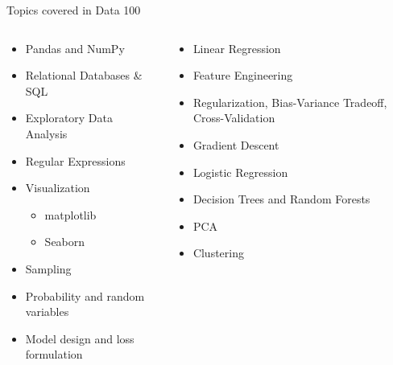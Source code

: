 \documentclass[aspectratio=169]{../latex_main/tntbeamer}  %
\begin{document}
	\begin{frame}{Topics covered in Data 100}
	    \begin{columns}
	        \begin{column}{.4\textwidth}
	            \begin{itemize}
	                \item Pandas and NumPy
	                \item Relational Databases \& SQL
	                \item Exploratory Data Analysis
	                \item Regular Expressions
	                \item Visualization
	                \begin{itemize}
	                    \item matplotlib
	                    \item Seaborn
	                \end{itemize}
	                \item Sampling
	                \item Probability and random variables
	                \item Model design and loss formulation
	            \end{itemize}
	        \end{column}
	        \begin{column}{.4\textwidth}
	                \begin{itemize}
	                    \item Linear Regression
	                    \item Feature Engineering
	                    \item Regularization, Bias-Variance Tradeoff, Cross-Validation
	                    \item Gradient Descent
	                    \item Logistic Regression
	                    \item Decision Trees and Random Forests
	                    \item PCA
	                    \item Clustering
	                \end{itemize}
	        \end{column}
	    \end{columns}
	\end{frame}
	
\end{document}

